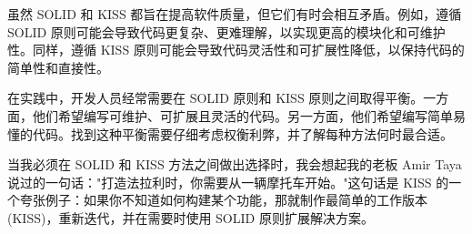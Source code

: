 虽然 SOLID 和 KISS 都旨在提高软件质量，但它们有时会相互矛盾。例如，遵循 SOLID 原则可能会导致代码更复杂、更难理解，以实现更高的模块化和可维护性。同样，遵循 KISS 原则可能会导致代码灵活性和可扩展性降低，以保持代码的简单性和直接性。

在实践中，开发人员经常需要在 SOLID 原则和 KISS 原则之间取得平衡。一方面，他们希望编写可维护、可扩展且灵活的代码。另一方面，他们希望编写简单易懂的代码。找到这种平衡需要仔细考虑权衡利弊，并了解每种方法何时最合适。

当我必须在 SOLID 和 KISS 方法之间做出选择时，我会想起我的老板 Amir Taya 说过的一句话："打造法拉利时，你需要从一辆摩托车开始。"这句话是 KISS 的一个夸张例子：如果你不知道如何构建某个功能，那就制作最简单的工作版本 (KISS)，重新迭代，并在需要时使用 SOLID 原则扩展解决方案。









